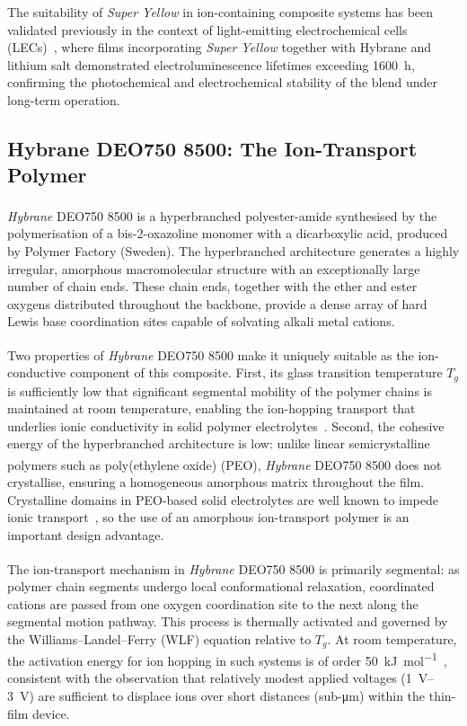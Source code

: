 \documentclass[12pt, a4paper, twoside]{report}
\newcommand{\SY}{\textit{Super Yellow}}
\newcommand{\Hybrane}{\textit{Hybrane}\textsuperscript{\textregistered} DEO750 8500}
\begin{document}
The suitability of \SY{} in ion-containing composite systems has been validated previously in the context of light-emitting electrochemical cells (LECs)~\cite{Mardegan2021}, where films incorporating \SY{} together with Hybrane and lithium salt demonstrated electroluminescence lifetimes exceeding \SI{1600}{\hour}, confirming the photochemical and electrochemical stability of the blend under long-term operation.

\subsection{Hybrane DEO750 8500: The Ion-Transport Polymer}\label{subsec:hybrane}

\Hybrane{} is a hyperbranched polyester-amide synthesised by the polymerisation of a bis-2-oxazoline monomer with a dicarboxylic acid, produced by Polymer Factory (Sweden). The hyperbranched architecture generates a highly irregular, amorphous macromolecular structure with an exceptionally large number of chain ends. These chain ends, together with the ether and ester oxygens distributed throughout the backbone, provide a dense array of hard Lewis base coordination sites capable of solvating alkali metal cations.

Two properties of \Hybrane{} make it uniquely suitable as the ion-conductive component of this composite. First, its glass transition temperature $T_g$ is sufficiently low that significant segmental mobility of the polymer chains is maintained at room temperature, enabling the ion-hopping transport that underlies ionic conductivity in solid polymer electrolytes~\cite{Armand1989}. Second, the cohesive energy of the hyperbranched architecture is low: unlike linear semicrystalline polymers such as poly(ethylene oxide) (PEO), \Hybrane{} does not crystallise, ensuring a homogeneous amorphous matrix throughout the film. Crystalline domains in PEO-based solid electrolytes are well known to impede ionic transport~\cite{Berthier1983}, so the use of an amorphous ion-transport polymer is an important design advantage.

The ion-transport mechanism in \Hybrane{} is primarily segmental: as polymer chain segments undergo local conformational relaxation, coordinated cations are passed from one oxygen coordination site to the next along the segmental motion pathway. This process is thermally activated and governed by the Williams--Landel--Ferry (WLF) equation relative to $T_g$. At room temperature, the activation energy for ion hopping in such systems is of order \SI{50}{\kilo\joule\per\mol}~\cite{Gray1991}, consistent with the observation that relatively modest applied voltages (\SIrange{1}{3}{\volt}) are sufficient to displace ions over short distances (sub-\si{\micro\metre}) within the thin-film device.
\end{document}
